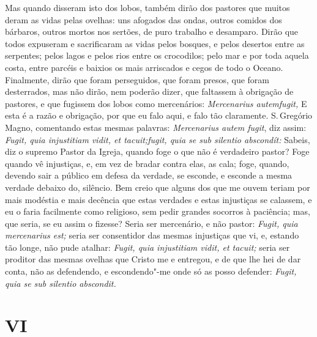 Mas quando disseram isto dos lobos, também dirão dos pastores que muitos
deram as vidas pelas ovelhas: uns afogados das ondas, outros comidos dos
bárbaros, outros mortos nos sertões, de puro trabalho e desamparo. Dirão
que todos expuseram e sacrificaram as vidas pelos bosques, e pelos
desertos entre as serpentes; pelos lagos e pelos rios entre os
crocodilos; pelo mar e por toda aquela costa, entre parcéis e baixios os
mais arriscados e cegos de todo o Oceano. Finalmente, dirão que foram
perseguidos, que foram presos, que foram desterrados, mas não dirão, nem
poderão dizer, que faltassem à obrigação de pastores, e que fugissem dos
lobos como mercenários: \emph{Mercenarius autemfugit,} E esta é a razão
e obrigação, por que eu falo aqui, e falo tão claramente. S.\,Gregório
Magno, comentando estas mesmas palavras: \emph{Mercenarius autem fugit}, diz assim: \emph{Fugit, quia injustitiam vidit, et tacuit;fugit,
quia se sub silentio abscondít:} Sabeis, diz o supremo Pastor da
Igreja, quando foge o que não é verdadeiro pastor? Foge quando vê
injustiças, e, em vez de bradar contra elas, as cala; foge, quando,
devendo sair a público em defesa da verdade, se esconde, e esconde a
mesma verdade debaixo do, silêncio. Bem creio que alguns dos que me
ouvem teriam por mais modéstia e mais decência que estas verdades e
estas injustiças se calassem, e eu o faria facilmente como religioso,
sem pedir grandes socorros à paciência; mas, que seria, se eu assim o
fizesse? Seria ser mercenário, e não pastor: \emph{Fugit, quia
mercenarius est;} seria ser consentidor das mesmas injustiças que vi, e,
estando tão longe, não pude atalhar: \emph{Fugit, quia injustitiam
vidit, et tacuit;} seria ser proditor das mesmas ovelhas que Cristo me e
entregou, e de que lhe hei de dar conta, não as defendendo, e
escondendo"-me onde só as posso defender: \emph{Fugit, quia se sub
silentio abscondit.}

\section*{VI}

